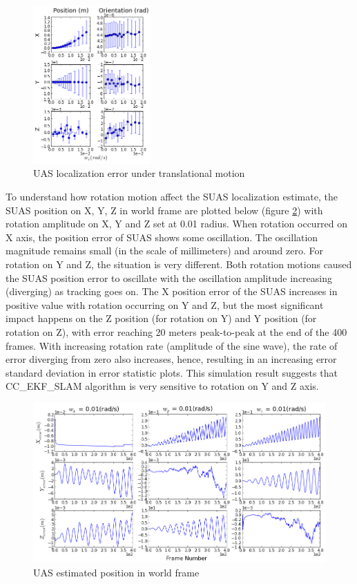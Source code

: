 \begin{figure}[h]
  \includegraphics[width=4.5cm, keepaspectratio=true]{./Figures/SimulationFigures/Figure13.png}
  \caption{UAS localization error under translational 
  \label{fig:simfig9-10}
    motion}
\end{figure}

To understand how rotation motion affect the SUAS localization estimate, the SUAS position on X, Y, Z in world frame are plotted below (figure \ref{fig:simfig14}) with rotation amplitude on X, Y and Z set at 0.01 radius. When rotation occurred on X axis, the position error of SUAS shows some oscillation. The oscillation magnitude remains small (in the scale of millimeters) and around zero. For rotation on Y and Z, the situation is very different. Both rotation motions caused the SUAS position error to oscillate with the oscillation amplitude increasing (diverging) as tracking goes on. The X position error of the SUAS increases in positive value with rotation occurring on Y and Z, but the most significant impact happens on the Z position (for rotation on Y) and Y position (for rotation on Z), with error reaching 20 meters peak-to-peak at the end of the 400 frames. With increasing rotation rate (amplitude of the sine wave), the rate of error diverging from zero also increases, hence, resulting in an increasing error standard deviation in error statistic plots. This simulation result suggests that CC\_EKF\_SLAM algorithm is very sensitive to rotation on Y and Z axis.

\begin{figure}[h]
  \centering
  \includegraphics[width=13cm, keepaspectratio=true]{./Figures/SimulationFigures/Figure14.png}
  \caption{UAS estimated position in world frame}
  \label{fig:simfig14}
\end{figure}
\FloatBarrier
